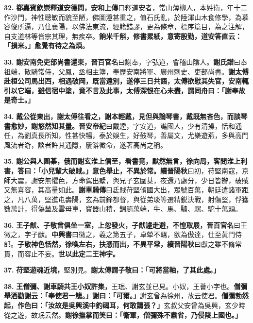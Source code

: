 \textbf{32.} \textbf{郗嘉賓欽崇釋道安德問，}{\footnotesize \textbf{安和上傳}曰釋道安者，常山薄柳人，本姓衛，年十二作沙門，神性聰敏而貌至陋，佛圖澄甚重之，值石氏亂，於陸渾山木食修學，為慕容俊所逼，乃住襄陽，以佛法東流，經籍錯謬，更為條章，標序篇目，為之注解，自支道林等皆宗其理，無疾卒。}\textbf{餉米千斛，修書累紙，意寄殷勤，道安答直云：「損米。」愈覺有待之為煩。}

\textbf{33.} \textbf{謝安南免吏部尚書還東，}{\footnotesize \textbf{晉百官名}曰謝奉，字弘道，會稽山陰人。\textbf{謝氏譜}曰奉祖端，散騎常侍，父鳳，丞相主簿，奉歷安南將軍、廣州刺史、吏部尚書。}\textbf{謝太傅赴桓公司馬出西，相遇破岡，既當遠別，遂停三日共語，太傅欲慰其失官，安南輒引以它端，雖信宿中塗，竟不言及此事，太傅深恨在心未盡，謂同舟曰：「謝奉故是奇士。」}

\textbf{34.} \textbf{戴公從東出，謝太傅往看之，謝本輕戴，見但與論琴書，戴既無吝色，而談琴書愈妙，謝悠然知其量。}{\footnotesize \textbf{晉安帝紀}曰戴逵，字安道，譙國人，少有清操，恬和通任，為劉真長所知，性甚快暢，泰於娛生，好鼓琴，善屬文，尤樂遊燕，多與高門風流者游，談者許其通隱，屢辭徵命，遂著高尚之稱。}

\textbf{35.} \textbf{謝公與人圍棊，俄而謝玄淮上信至，看書竟，默然無言，徐向局，客問淮上利害，答曰：「小兒輩大破賊。」意色舉止，不異於常。}{\footnotesize \textbf{續晉陽秋}曰初，苻堅南寇，京師大震，謝安無懼色，方命駕出墅，與兄子玄圍棊，夜還乃處分，少日皆辦，破賊又無喜容，其高量如此。\textbf{謝車騎傳}曰氐賊苻堅傾國大出，眾號百萬，朝廷遣諸軍距之，凡八萬，堅進屯壽陽，玄為前鋒都督，與從弟琰等選精鋭決戰，射傷堅，俘獲數萬計，得偽輦及雲母車，寶器山積，錦罽萬端，牛、馬、驢、騾、駝十萬頭。}

\textbf{36.} \textbf{王子猷、子敬曾俱坐一室，上忽發火，子猷遽走避，不惶取屐，}{\footnotesize \textbf{晉百官名}曰王徽之，字子猷。\textbf{中興書}曰徽之，羲之第五子，卓犖不羈，欲為傲達，仕至黃門侍郎。}\textbf{子敬神色恬然，徐喚左右，扶憑而出，不異平常，}{\footnotesize \textbf{續晉陽秋}曰獻之雖不脩常貫，而容止不妄。}\textbf{世以此定二王神宇。}

\textbf{37.} \textbf{苻堅遊魂近境，}{\footnotesize 堅別見。}\textbf{謝太傅謂子敬曰：「可將當軸，了其此處。」}

\textbf{38.} \textbf{王僧彌、謝車騎共王小奴許集，}{\footnotesize 王珉、謝玄並已見。小奴，王薈小字也。}\textbf{僧彌舉酒勸謝云：「奉使君一觴。」謝曰：「可爾。」}{\footnotesize 謝玄曾為徐州，故云使君。}\textbf{僧彌勃然起，作色曰：「汝故是吳興溪中釣碣耳，何敢譸張？」}{\footnotesize 玄叔父安曾為吳興，玄少時從之遊，故珉云然。}\textbf{謝徐撫掌而笑曰：「衛軍，僧彌殊不肅省，乃侵陵上國也。」}

